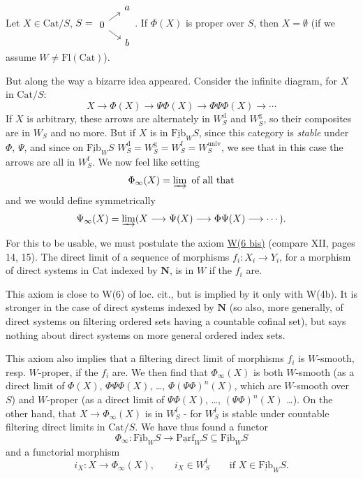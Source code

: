 \documentclass[11pt]{article}
\newcommand{\printedpage}[1]{\marginpar{\footnotesize p.~#1}}
\newcommand{\msp}[1]{\marginpar{\footnotesize [#1]}}
\newcommand{\und}[1]{\underline{\mathrm{#1}}}
\begin{document}
\printedpage{119}

\noindent\llap{$|||$\quad}Let $X \in \mathrm{Cat}/S$, $S = \begin{tikzcd}[row sep=tiny, column sep=small] & a \\ 0 \arrow[ur] \arrow[dr] & \\ & b \end{tikzcd}$. If $\Phi(X)$ is proper over $S$, then $X = \emptyset$ (if we assume $W \neq \mathrm{Fl}(\mathrm{Cat})$).

But along the way a bizarre idea appeared. Consider the infinite diagram, for $X$ in $\mathrm{Cat}/S$:
\[
X \longrightarrow \Phi(X) \longrightarrow \Psi\Phi(X) \longrightarrow \Phi\Psi\Phi(X) \longrightarrow \cdots
\]
If $X$ is arbitrary, these arrows are alternately in $W_S^{\mathrm{d}}$ and $W_S^{\mathrm{g}}$, so their composites are in $W_S$ and no more. But if $X$ is in $\und{Fib}_W S$, since this category is \textit{stable} under $\Phi$, $\Psi$, and since on $\und{Fib}_W S$ $W_S^{\mathrm{d}} = W_S^{\mathrm{g}} = W_S^{\mathrm{f}} = W_S^{\mathrm{univ}}$, we see that in this case the arrows are all in $W_S^{\mathrm{f}}$. We now feel like setting
\[
\Phi_\infty(X) = \varinjlim \text{ of all that}
\]
\msp{page 193}
and we would define symmetrically
\[
\Psi_\infty(X) = \varinjlim (X \longrightarrow \Psi(X) \longrightarrow \Phi\Psi(X) \longrightarrow \cdots).
\]

For this to be usable, we must postulate the axiom \underline{W(6 bis)} (compare XII, pages 14, 15). The direct limit of a sequence of morphisms $f_i : X_i \longrightarrow Y_i$, for a morphism of direct systems in Cat indexed by $\mathbf{N}$, is in $W$ if the $f_i$ are.

This axiom is close to W(6) of loc. cit., but is implied by it only with W(4b). It is stronger in the case of direct systems indexed by $\mathbf{N}$ (so also, more generally, of direct systems on filtering ordered sets having a countable cofinal set), but says nothing about direct systems on more general ordered index sets.

This axiom also implies that a filtering direct limit of morphisms $f_i$ is $W$-smooth, resp. $W$-proper, if the $f_i$ are. We then find that $\Phi_\infty(X)$ is both $W$-smooth (as a direct limit of $\Phi(X)$, $\Phi\Psi\Phi(X)$, \ldots, $\Phi(\Psi\Phi)^n(X)$, which are $W$-smooth over $S$) and $W$-proper (as a direct limit of $\Psi\Phi(X)$, \ldots, $(\Psi\Phi)^n(X)$ \ldots). On the other hand, that $X \longrightarrow \Phi_\infty(X)$ is in $W_S^{\mathrm{f}}$ - for $W_S^{\mathrm{f}}$ is stable under countable filtering direct limits in $\mathrm{Cat}/S$. We have thus found a functor
\msp{page 194}
\[
\Phi_\infty : \und{Fib}_W S \longrightarrow \und{Parf}_W S \subseteq \und{Fib}_W S
\]
and a functorial morphism
\[
i_X : X \longrightarrow \Phi_\infty(X), \qquad \boxed{i_X \in W_S^{\mathrm{f}}} \qquad \text{if } X \in \und{Fib}_W S.
\]
\end{document}
